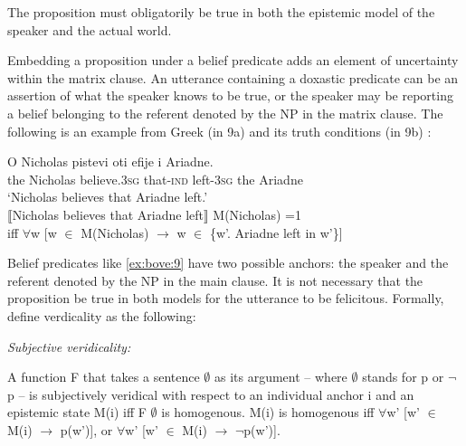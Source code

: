 \documentclass[output=paper,colorlinks,citecolor=brown,
]{langscibook}
\begin{document}
The proposition must obligatorily be true in both the epistemic model of the speaker and the actual world. 



Embedding a proposition under a belief predicate adds an element of uncertainty within the matrix clause. An utterance containing a doxastic predicate can be an assertion of what the speaker knows to be true, or the speaker may be reporting a belief belonging to the referent denoted by the NP in the matrix clause. The following is an example from Greek (in 9a) and its truth conditions (in 9b) \citep[21]{Giannakidou2015}:




\begin{exe} %
    \ex\label{ex:bove:9} 
    \begin{xlist} %
        \ex \label{ex:bove:9a}
            \gll  O Nicholas pistevi oti efije i Ariadne.\\  
           the Nicholas believe.\textsc{3sg} that-\textsc{ind} left-\textsc{3sg} the Ariadne\\%
                   \glt `Nicholas believes that Ariadne left.'\\
               \ex\label{ex:bove:9b}
               ⟦Nicholas believes that Ariadne left⟧  M(Nicholas) =1\\
               
iff ${\forall}$w [w ${\in}$ M(Nicholas) $\rightarrow$ w ${\in}$ \{w'. Ariadne left in w'\}]
               
\end{xlist}
\end{exe}




Belief predicates like \ref{ex:bove:9} have two possible anchors: the speaker and the referent denoted by the NP in the main clause. It is not necessary that the proposition be true in both models for the utterance to be felicitous. Formally, \citet[57]{GiannakidouMari2020} define verdicality as the following:

\begin{exe}
    \ex\label{ex:bove:10}
   \textit{Subjective veridicality:}
     \begin{xlist}
         \ex  A function F that takes a sentence  ${\emptyset}$ as its argument -- where  ${\emptyset}$ stands for p or $\neg$p -- is subjectively veridical with respect to an individual anchor
i and an epistemic state M(i) iff F  ${\emptyset}$ is homogenous.
\ex M(i) is homogenous iff ${\forall}$w' [w' ${\in}$ M(i) $\rightarrow$ p(w')], or ${\forall}$w' [w' ${\in}$ M(i) $\rightarrow$ $\neg$p(w')].
     \end{xlist}
 \end{exe}
  
\end{document}
